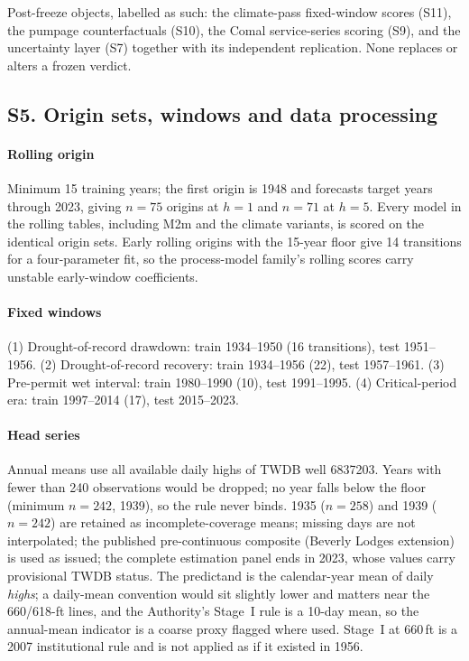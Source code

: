 \documentclass[11pt]{article}
\begin{document}
Post-freeze objects, labelled as such: the climate-pass fixed-window scores (S11), the pumpage counterfactuals (S10), the Comal service-series scoring (S9), and the uncertainty layer (S7) together with its independent replication. None replaces or alters a frozen verdict.

\subsection{S5. Origin sets, windows and data processing}\label{si:edworigins}

\paragraph{Rolling origin} Minimum 15 training years; the first origin is 1948 and forecasts target years through 2023, giving $n=75$ origins at $h=1$ and $n=71$ at $h=5$. Every model in the rolling tables, including M2m and the climate variants, is scored on the identical origin sets. Early rolling origins with the 15-year floor give 14 transitions for a four-parameter fit, so the process-model family's rolling scores carry unstable early-window coefficients.

\paragraph{Fixed windows} (1) Drought-of-record drawdown: train 1934--1950 (16 transitions), test 1951--1956. (2) Drought-of-record recovery: train 1934--1956 (22), test 1957--1961. (3) Pre-permit wet interval: train 1980--1990 (10), test 1991--1995. (4) Critical-period era: train 1997--2014 (17), test 2015--2023.

\paragraph{Head series} Annual means use all available daily highs of TWDB well 6837203. Years with fewer than 240 observations would be dropped; no year falls below the floor (minimum $n=242$, 1939), so the rule never binds. 1935 ($n=258$) and 1939 ($n=242$) are retained as incomplete-coverage means; missing days are not interpolated; the published pre-continuous composite (Beverly Lodges extension) is used as issued; the complete estimation panel ends in 2023, whose values carry provisional TWDB status. The predictand is the calendar-year mean of daily \emph{highs}; a daily-mean convention would sit slightly lower and matters near the 660/618-ft lines, and the Authority's Stage~I rule is a 10-day mean, so the annual-mean indicator is a coarse proxy flagged where used. Stage~I at 660\,ft is a 2007 institutional rule and is not applied as if it existed in 1956.
\end{document}
